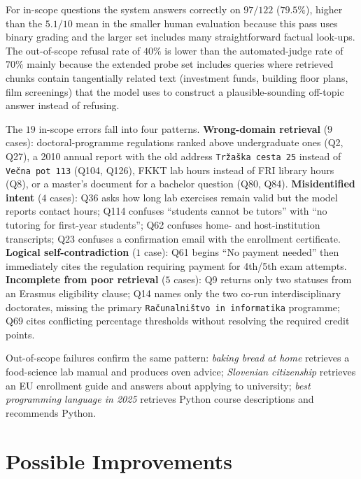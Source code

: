 \documentclass[fleqn,moreauthors,10pt]{ds_report}
\begin{document}
For in-scope questions the system answers correctly on $97/122$ ($79.5\%$), higher than the $5.1/10$ mean in the smaller human evaluation because this pass uses binary grading and the larger set includes many straightforward factual look-ups. The out-of-scope refusal rate of $40\%$ is lower than the automated-judge rate of $70\%$ mainly because the extended probe set includes queries where retrieved chunks contain tangentially related text (investment funds, building floor plans, film screenings) that the model uses to construct a plausible-sounding off-topic answer instead of refusing.

The $19$ in-scope errors fall into four patterns. \textbf{Wrong-domain retrieval} ($9$ cases): doctoral-programme regulations ranked above undergraduate ones (Q2, Q27), a 2010 annual report with the old address \texttt{Tržaška cesta 25} instead of \texttt{Večna pot 113} (Q104, Q126), FKKT lab hours instead of FRI library hours (Q8), or a master's document for a bachelor question (Q80, Q84). \textbf{Misidentified intent} ($4$ cases): Q36 asks how long lab exercises remain valid but the model reports contact hours; Q114 confuses ``students cannot be tutors'' with ``no tutoring for first-year students''; Q62 confuses home- and host-institution transcripts; Q23 confuses a confirmation email with the enrollment certificate. \textbf{Logical self-contradiction} ($1$ case): Q61 begins ``No payment needed'' then immediately cites the regulation requiring payment for 4th/5th exam attempts. \textbf{Incomplete from poor retrieval} ($5$ cases): Q9 returns only two statuses from an Erasmus eligibility clause; Q14 names only the two co-run interdisciplinary doctorates, missing the primary \texttt{Računalništvo in informatika} programme; Q69 cites conflicting percentage thresholds without resolving the required credit points.

Out-of-scope failures confirm the same pattern: \emph{baking bread at home} retrieves a food-science lab manual and produces oven advice; \emph{Slovenian citizenship} retrieves an EU enrollment guide and answers about applying to university; \emph{best programming language in 2025} retrieves Python course descriptions and recommends Python.

\section{Possible Improvements}
\label{app:improvements}
\end{document}
